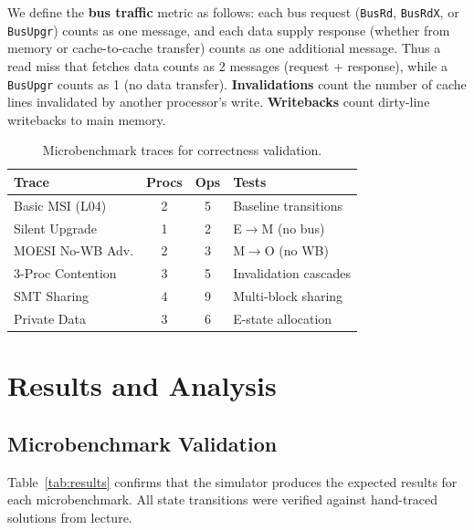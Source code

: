 \documentclass[10pt,twocolumn]{article}
\begin{document}
We define the \textbf{bus traffic} metric as follows: each bus request (\texttt{BusRd}, \texttt{BusRdX}, or \texttt{BusUpgr}) counts as one message, and each data supply response (whether from memory or cache-to-cache transfer) counts as one additional message. Thus a read miss that fetches data counts as 2 messages (request + response), while a \texttt{BusUpgr} counts as 1 (no data transfer). \textbf{Invalidations} count the number of cache lines invalidated by another processor's write. \textbf{Writebacks} count dirty-line writebacks to main memory.

\begin{table}[h]
\centering
\caption{Microbenchmark traces for correctness validation.}
\label{tab:traces}
\small
\begin{tabular}{@{}lccl@{}}
\toprule
\textbf{Trace} & \textbf{Procs} & \textbf{Ops} & \textbf{Tests} \\
\midrule
Basic MSI (L04) & 2 & 5 & Baseline transitions \\
Silent Upgrade & 1 & 2 & E$\to$M (no bus) \\
MOESI No-WB Adv. & 2 & 3 & M$\to$O (no WB) \\
3-Proc Contention & 3 & 5 & Invalidation cascades \\
SMT Sharing & 4 & 9 & Multi-block sharing \\
Private Data & 3 & 6 & E-state allocation \\
\bottomrule
\end{tabular}
\end{table}

\section{Results and Analysis}

\subsection{Microbenchmark Validation}

Table~\ref{tab:results} confirms that the simulator produces the expected results for each microbenchmark. All state transitions were verified against hand-traced solutions from lecture.
\end{document}
